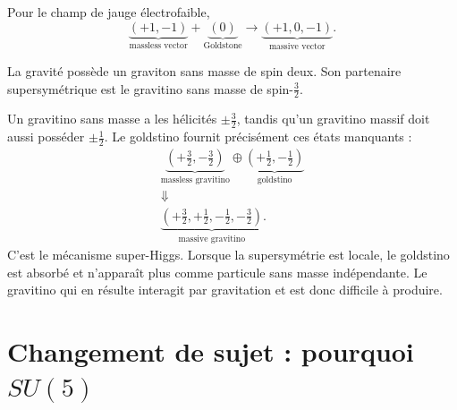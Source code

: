 Pour le champ de jauge électrofaible,
\begin{equation}
\underbrace{(+1,-1)}_{\text{massless vector}}
+
\underbrace{(0)}_{\text{Goldstone}}
\longrightarrow
\underbrace{(+1,0,-1)}_{\text{massive vector}}.
\label{eq:l9-higgs-count}
\end{equation}

\begin{classroomqa}\end{classroomqa}

La gravité possède un graviton sans masse de spin deux. Son partenaire supersymétrique est le gravitino sans masse de spin-\(\tfrac32\).

\begin{classroomqa}\end{classroomqa}

Un gravitino sans masse a les hélicités \(\pm\tfrac32\), tandis qu’un gravitino massif doit aussi posséder \(\pm\tfrac12\). Le goldstino fournit précisément ces états manquants :
\begin{equation}
\begin{gathered}
\underbrace{\left(+\frac32,-\frac32\right)}_{\text{massless gravitino}}
\oplus
\underbrace{\left(+\frac12,-\frac12\right)}_{\text{goldstino}}\\
\Downarrow\\
\underbrace{\left(+\frac32,+\frac12,-\frac12,-\frac32\right)}_{\text{massive gravitino}}.
\end{gathered}
\label{eq:l9-super-higgs}
\end{equation}
C’est le mécanisme super-Higgs. Lorsque la supersymétrie est locale, le goldstino est absorbé et n’apparaît plus comme particule sans masse indépendante. Le gravitino qui en résulte interagit par gravitation et est donc difficile à produire.

\section{Changement de sujet : pourquoi \texorpdfstring{\(SU(5)\)}{SU(5)}}

